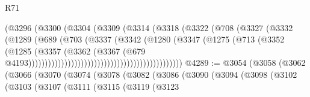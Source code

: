\begin{lexlean}{R71}
\begin{coremodule}
                                                (@3296
                                                  (@3300
                                                    (@3304
                                                      (@3309
                                                        (@3314
                                                          (@3318
                                                            (@3322
                                                              (@708
                                                                (@3327
                                                                  (@3332
                                                                    (@1289
                                                                      (@689
                                                                        (@703
                                                                          (@3337
                                                                            (@3342
                                                                              (@1280
                                                                                (@3347
                                                                                  (@1275
                                                                                    (@713
                                                                                      (@3352
                                                                                        (@1285
                                                                                          (@3357
                                                                                            (@3362
                                                                                              (@3367
                                                                                                (@679
                                                                                                  @4193)))))))))))))))))))))))))))))))))))))))))))))))
@4289 := @3054
    (@3058
      (@3062
        (@3066
          (@3070
            (@3074
              (@3078
                (@3082
                  (@3086
                    (@3090
                      (@3094
                        (@3098
                          (@3102
                            (@3103
                              (@3107
                                (@3111
                                  (@3115
                                    (@3119
                                      (@3123

\end{coremodule}
\end{lexlean}
